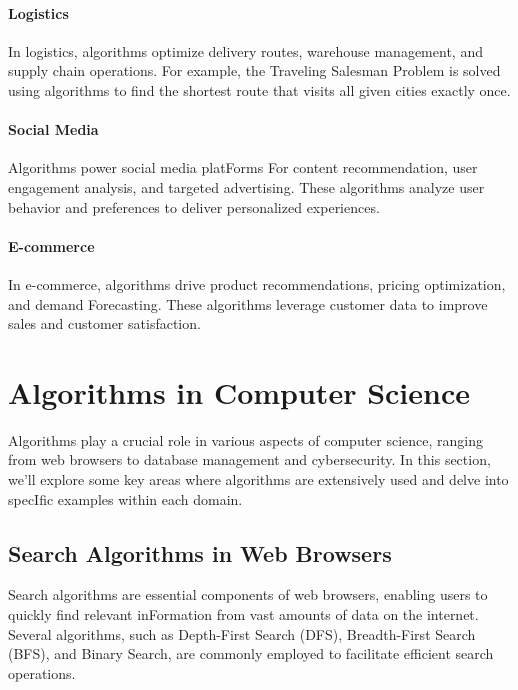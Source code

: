 \documentclass[12pt]{book} %
\begin{document}
\paragraph{Logistics}
In logistics, algorithms optimize delivery routes, warehouse management, and supply chain operations. For example, the Traveling Salesman Problem is solved using algorithms to find the shortest route that visits all given cities exactly once.

\paragraph{Social Media}
Algorithms power social media platForms For content recommendation, user engagement analysis, and targeted advertising. These algorithms analyze user behavior and preferences to deliver personalized experiences.

\paragraph{E-commerce}
In e-commerce, algorithms drive product recommendations, pricing optimization, and demand Forecasting. These algorithms leverage customer data to improve sales and customer satisfaction.


\section{Algorithms in Computer Science}
Algorithms play a crucial role in various aspects of computer science, ranging from web browsers to database management and cybersecurity. In this section, we'll explore some key areas where algorithms are extensively used and delve into specIfic examples within each domain.

\subsection{Search Algorithms in Web Browsers}
Search algorithms are essential components of web browsers, enabling users to quickly find relevant inFormation from vast amounts of data on the internet. Several algorithms, such as Depth-First Search (DFS), Breadth-First Search (BFS), and Binary Search, are commonly employed to facilitate efficient search operations.
\end{document}
